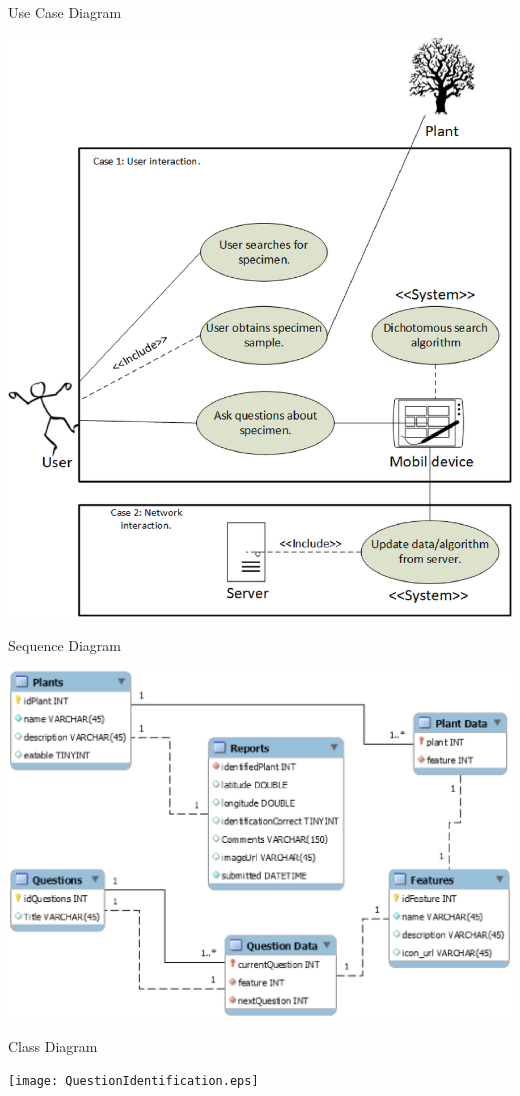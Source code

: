 \documentclass{beamer}
\begin{document}
\begin{frame}{Use Case Diagram}
\begin{center}\includegraphics[scale=.35]{search.eps}\end{center}
\end{frame}
\begin{frame}{Sequence Diagram}
\begin{center}\includegraphics[scale=.5]{DatabaseDesign.eps}\end{center}
\end{frame}
\begin{frame}{Class Diagram}
\begin{center}\texttt{[image: QuestionIdentification.eps]}\end{center}
\end{frame}
\end{document}
